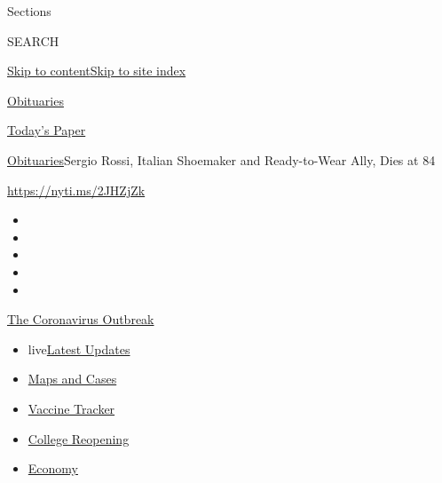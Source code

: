 Sections

SEARCH

\protect\hyperlink{site-content}{Skip to
content}\protect\hyperlink{site-index}{Skip to site index}

\href{https://www.nytimes.com/section/obituaries}{Obituaries}

\href{https://myaccount.nytimes.com/auth/login?response_type=cookie\&client_id=vi}{}

\href{https://www.nytimes.com/section/todayspaper}{Today's Paper}

\href{/section/obituaries}{Obituaries}\textbar{}Sergio Rossi, Italian
Shoemaker and Ready-to-Wear Ally, Dies at 84

\url{https://nyti.ms/2JHZjZk}

\begin{itemize}
\item
\item
\item
\item
\item
\end{itemize}

\href{https://www.nytimes.com/news-event/coronavirus?action=click\&pgtype=Article\&state=default\&region=TOP_BANNER\&context=storylines_menu}{The
Coronavirus Outbreak}

\begin{itemize}
\tightlist
\item
  live\href{https://www.nytimes.com/2020/08/03/world/coronavirus-covid-19.html?action=click\&pgtype=Article\&state=default\&region=TOP_BANNER\&context=storylines_menu}{Latest
  Updates}
\item
  \href{https://www.nytimes.com/interactive/2020/us/coronavirus-us-cases.html?action=click\&pgtype=Article\&state=default\&region=TOP_BANNER\&context=storylines_menu}{Maps
  and Cases}
\item
  \href{https://www.nytimes.com/interactive/2020/science/coronavirus-vaccine-tracker.html?action=click\&pgtype=Article\&state=default\&region=TOP_BANNER\&context=storylines_menu}{Vaccine
  Tracker}
\item
  \href{https://www.nytimes.com/2020/08/02/us/covid-college-reopening.html?action=click\&pgtype=Article\&state=default\&region=TOP_BANNER\&context=storylines_menu}{College
  Reopening}
\item
  \href{https://www.nytimes.com/live/2020/08/03/business/stock-market-today-coronavirus?action=click\&pgtype=Article\&state=default\&region=TOP_BANNER\&context=storylines_menu}{Economy}
\end{itemize}

